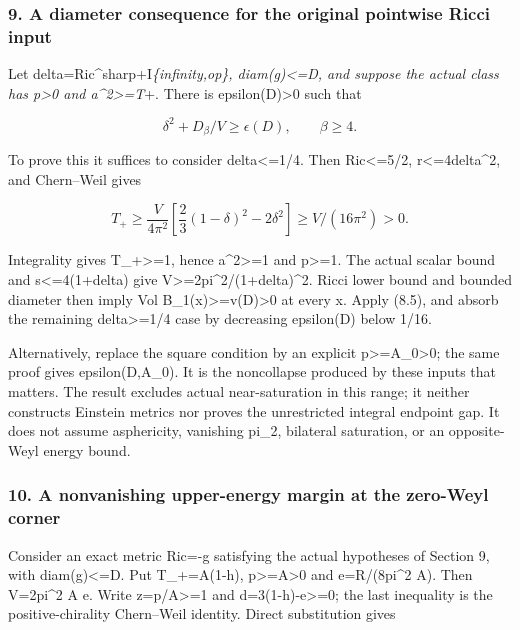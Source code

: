 \documentclass[
  10pt,
]{article}
\begin{document}
\hypertarget{a-diameter-consequence-for-the-original-pointwise-ricci-input}{%
\subsubsection{9. A diameter consequence for the original pointwise
Ricci
input}\label{a-diameter-consequence-for-the-original-pointwise-ricci-input}}

Let
delta=\textbar\textbar Ric\^{}sharp+I\textbar\textbar{}\emph{\{infinity,op\},
diam(g)\textless=D, and suppose the actual class has p\textgreater0 and
a\^{}2\textgreater=T}+. There is epsilon(D)\textgreater0 such that

\[
                  \boxed{\delta^2+D_\beta/V\ge\epsilon(D),
                              \qquad\beta\ge4.}       \tag{9.1}
\]

To prove this it suffices to consider delta\textless=1/4. Then
\textbar Ric\textbar\textless=5/2, r\textless=4delta\^{}2, and
Chern--Weil gives

\[
 T_+\ge\frac{V}{4\pi^2}
       \left[\frac23(1-\delta)^2-2\delta^2\right]
       \ge V/(16\pi^2)>0.
\]

Integrality gives T\_+\textgreater=1, hence a\^{}2\textgreater=1 and
p\textgreater=1. The actual scalar bound and
\textbar s\textbar\textless=4(1+delta) give
V\textgreater=2pi\^{}2/(1+delta)\^{}2. Ricci lower bound and bounded
diameter then imply Vol B\_1(x)\textgreater=v(D)\textgreater0 at every
x. Apply (8.5), and absorb the remaining delta\textgreater=1/4 case by
decreasing epsilon(D) below 1/16.

Alternatively, replace the square condition by an explicit
p\textgreater=A\_0\textgreater0; the same proof gives epsilon(D,A\_0).
It is the noncollapse produced by these inputs that matters. The result
excludes actual near-saturation in this range; it neither constructs
Einstein metrics nor proves the unrestricted integral endpoint gap. It
does not assume asphericity, vanishing pi\_2, bilateral saturation, or
an opposite-Weyl energy bound.

\hypertarget{a-nonvanishing-upper-energy-margin-at-the-zero-weyl-corner}{%
\subsubsection{10. A nonvanishing upper-energy margin at the zero-Weyl
corner}\label{a-nonvanishing-upper-energy-margin-at-the-zero-weyl-corner}}

Consider an exact metric Ric=-g satisfying the actual hypotheses of
Section 9, with diam(g)\textless=D. Put T\_+=A(1-h),
p\textgreater=A\textgreater0 and e=R/(8pi\^{}2 A). Then V=2pi\^{}2 A e.
Write z=p/A\textgreater=1 and d=3(1-h)-e\textgreater=0; the last
inequality is the positive-chirality Chern--Weil identity. Direct
substitution gives
\end{document}
